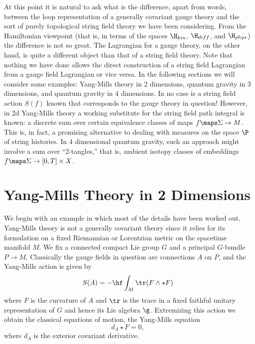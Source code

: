 At this point it is natural to ask what is the difference, apart from
words, between the loop representation of a generally covariant gauge
theory and the sort of purely topological string field theory we have been
considering.   From the Hamiltonian viewpoint (that is, in terms of the
spaces $\H_{kin}$, $\H_{diff}$, and $\H_{phys}$) the difference is not so
great.  The Lagrangian for a gauge theory, on the other hand, is quite a
different object than that of a string field theory. Note that nothing we
have done allows the direct construction of a string field Lagrangian from
a gauge field Lagrangian or vice versa. In the following sections we will
consider some examples:  Yang-Mills theory in 2 dimensions, quantum gravity
in 3 dimensions, and quantum gravity in 4 dimensions.  In no case is a
string field action $S(f)$ known that corresponds to the gauge theory in
question!    However, in 2d Yang-Mills theory a working substitute for the
string field path integral is known: a discrete sum over certain
equivalence classes of maps $f \maps \Sigma \to M$.  This is, in fact, a
promising alternative to dealing with measures on the space $\P$ of string
histories.   In 4 dimensional quantum gravity, such an approach might
involve a sum over ``2-tangles,'' that is, ambient isotopy classes of
embeddings $f \maps \Sigma \to [0,T] \times X$.

\section{Yang-Mills Theory in 2 Dimensions}

We begin with an example in which most of the details have been worked out.
Yang-Mills theory is not a generally covariant theory since it relies for
its formulation on a fixed Riemannian or Lorentzian metric on the spacetime
manifold $M$.  We fix a connected compact Lie group $G$ and a principal
$G$-bundle $P \to M$.  Classically the gauge fields in question are
connections $A$ on $P$, and the Yang-Mills action is given by
\[         S(A) =   -\hf \int_M \tr(F\wedge\star F)   \]
where $F$ is the curvature of $A$ and $\tr$ is the trace in a fixed
faithful unitary representation of $G$ and hence its Lie algebra $\g$.
Extremizing this action we obtain the classical equations of motion, the
Yang-Mills equation
\[           d_A \star F = 0, \]
where $d_A$ is the exterior covariant derivative.

